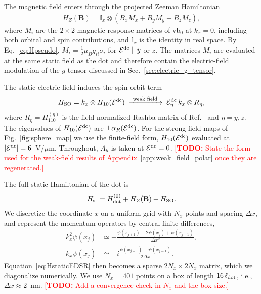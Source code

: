 \documentclass[
  aps,
  reprint,
  amsmath,
  amssymb,
  groupedaddress,
  floatfix,
  longbibliography,
]{revtex4-2}
\newcommand{\todo}[1]{\textcolor{red}{[\textbf{TODO:} #1]}}
\newcommand{\Edc}{\mathcal{E}^{\rm dc}}
\newcommand{\ldot}{\ell_{\rm dot}}
\begin{document}
The magnetic field enters through the projected Zeeman Hamiltonian
\begin{align}
H_Z(\mathbf{B})
=
\mathbb{I}_{x}
\otimes
\left(
B_x M_x + B_y M_y + B_z M_z
\right),
\label{eq:HZdot}
\end{align}
where $M_i$ are the $2\times2$ magnetic-response matrices of vb$_0$ at $k_x=0$, including both orbital and spin contributions, and $\mathbb{I}_{x}$ is the identity in real space. By Eq.~\eqref{eq:Hpseudo}, $M_i=\tfrac12\mu_B g_{ii}\sigma_i$ for $\Edc\parallel y$ or $z$. The matrices $M_i$ are evaluated at the same static field as the dot and therefore contain the electric-field modulation of the $g$ tensor discussed in Sec.~\ref{sec:electric_g_tensor}.

The static electric field induces the spin-orbit term
\begin{align}
H_{\rm SO}
=
k_x
\otimes
H_{10}(\Edc)
\;\xrightarrow{\ \text{weak field}\ }\;
\mathcal{E}_{\eta}^{\rm dc}\,k_x\otimes R_{\eta},
\label{eq:HSOdot}
\end{align}
where $R_\eta=H_{110}^{(\eta)}$ is the field-normalized Rashba matrix of Ref.~\cite{das2026anisotropic} and $\eta=y,z$. The eigenvalues of $H_{10}(\Edc)$ are $\pm\alpha_R(\Edc)$.
For the strong-field maps of Fig.~\ref{fig:sphere_map} we use the finite-field form, $H_{10}(\Edc)$ evaluated at $|\Edc|=6$~V/$\mu$m. Throughout, $A_h$ is taken at $\Edc=0$.
\todo{State the form used for the weak-field results of Appendix~\ref{app:weak_field_polar} once they are regenerated.}

The full static Hamiltonian of the dot is
\begin{align}
H_{\rm st}
=
H_{\rm dot}^{(0)}
+
H_Z(\mathbf{B})
+
H_{\rm SO}.
\label{eq:HstaticEDSR}
\end{align}
We discretize the coordinate $x$ on a uniform grid with $N_x$ points and spacing $\Delta x$, and represent the momentum operators by central finite differences,
\begin{align}
k_x^2 \psi(x_j) & \simeq
-\frac{
\psi(x_{j+1}) - 2\psi(x_j) + \psi(x_{j-1})
}{\Delta x^2},
\\
k_x \psi(x_j)
&\simeq
-i
\frac{
\psi(x_{j+1})-\psi(x_{j-1})
}{2\Delta x}.
\end{align}
Equation~\eqref{eq:HstaticEDSR} then becomes a sparse $2N_x\times2N_x$ matrix, which we diagonalize numerically. We use $N_x=401$ points on a box of length $16\,\ldot$, i.e., $\Delta x\approx2$~nm.
\todo{Add a convergence check in $N_x$ and the box size.}
\end{document}
